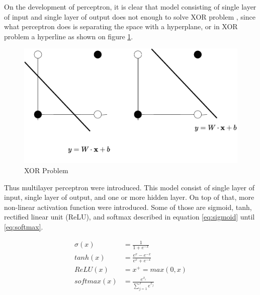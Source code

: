     On the development of perceptron, it is clear that model
    consisting of single layer of input and single layer of output
    does not enough to solve XOR problem
    \citep{Goodfellow-et-al-2016}, since what perceptron does is
    separating the space with a hyperplane, or in XOR problem a
    hyperline as shown on figure \ref{fig:xor}. 
    \begin{figure}
        \centering
        \includegraphics[width=.7\linewidth]{images/xor.pdf}
        \caption{XOR Problem}
        \label{fig:xor}
    \end{figure}
    Thus multilayer perceptron were introduced. This model consist of
    single layer of input, single layer of output, and one or more
    hidden layer. On top of that, more non-linear activation function
    were introduced. Some of those are sigmoid, tanh, rectified linear
    unit (ReLU), and softmax described in equation \ref{eq:sigmoid}
    until \ref{eq:softmax}.

    \begin{align}
        \label{eq:sigmoid}
        \sigma(x) &= \frac{1}{1+e^{-x}} \\
        \label{eq:tanh}
        tanh(x) &= \frac{e^x-e^{-x}}{e^x + e^{-x}}\\
        \label{eq:relu}
        ReLU(x) &= x^+ = max(0, x)\\
        \label{eq:softmax}
        softmax(x) &= \frac{e^{x_i}}{\sum_{j=1}^J e^{x_j}}
    \end{align}

